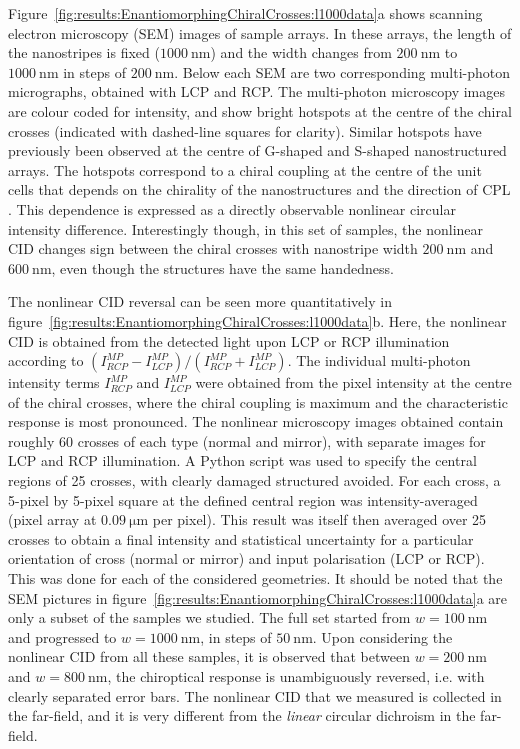 Figure~\ref{fig:results:EnantiomorphingChiralCrosses:l1000data}a shows scanning electron microscopy (SEM) images of sample arrays. In these arrays, the length of the nanostripes is fixed ($\SI{1000}{\nano\m}$) and the width changes from $\SI{200}{\nano\m}$ to $\SI{1000}{\nano\m}$ in steps of $\SI{200}{\nano\m}$. Below each SEM are two corresponding multi-photon micrographs, obtained with LCP and RCP. The multi-photon microscopy images are colour coded for intensity, and show bright hotspots at the centre of the chiral crosses (indicated with dashed-line squares for clarity). 
Similar hotspots have previously been observed at the centre of G-shaped \cite{Valev2009a} and S-shaped \cite{Valev2014} nanostructured arrays. 
The hotspots correspond to a chiral coupling at the centre of the unit cells that depends on the chirality of the nanostructures and the direction of CPL \cite{Valev2014, Petralli-Mallow1993, Byers1994}. This dependence is expressed as a directly observable nonlinear circular intensity difference. Interestingly though, in this set of samples, the nonlinear CID changes sign between the chiral crosses with nanostripe width  $\SI{200}{\nano\m}$ and $\SI{600}{\nano\m}$, even though the structures have the same handedness.

The nonlinear CID reversal can be seen more quantitatively in figure~\ref{fig:results:EnantiomorphingChiralCrosses:l1000data}b. Here, the nonlinear CID is obtained from the detected light upon LCP or RCP illumination according to 
$(I_{RCP}^{MP}-I_{LCP}^{MP})/(I_{RCP}^{MP}+I_{LCP}^{MP})$. The individual multi-photon intensity terms $I_{RCP}^{MP}$ and $I_{LCP}^{MP}$ were obtained from the pixel intensity at the centre of the chiral crosses, where the chiral coupling is maximum and the characteristic response is most pronounced. 
The nonlinear microscopy images obtained contain roughly 60 crosses of each type (normal and mirror), with separate images for LCP and RCP illumination. A Python script was used to specify the central regions of 25 crosses, with clearly damaged structured avoided. For each cross, a 5-pixel by 5-pixel square at the defined central region was intensity-averaged (pixel array at $\SI{0.09}{\micro\m}$ per pixel). This result was itself then averaged over 25 crosses to obtain a final intensity and statistical uncertainty for a particular orientation of cross (normal or mirror) and input polarisation (LCP or RCP). This was done for each of the considered geometries. 
It should be noted that the SEM pictures in figure~\ref{fig:results:EnantiomorphingChiralCrosses:l1000data}a are only a subset of the samples we studied. The full set started from $w= \SI{100}{\nano\m}$ and progressed to $w=\SI{1000}{\nano\m}$, in steps of $\SI{50}{\nano\m}$. 
Upon considering the nonlinear CID from all these samples, it is observed that between $w=\SI{200}{\nano\m}$ and $w=\SI{800}{\nano\m}$, the chiroptical response is unambiguously reversed, i.e. with clearly separated error bars. The nonlinear CID that we measured is collected in the far-field, and it is very different from the \textit{linear} circular dichroism in the far-field. 

